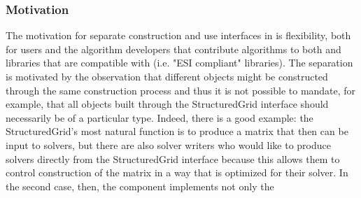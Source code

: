 \subsubsection{Motivation} The motivation for separate construction and use interfaces in
\hypre{} is flexibility, both for 
users and the algorithm developers that contribute algorithms to both \hypre{} and
libraries that are 
compatible with \hypre{} (i.e. "ESI compliant" libraries). The separation is
motivated by the observation 
that different objects might be constructed through the same construction
process and thus it is not possible 
to mandate, for example, that all objects built through the StructuredGrid
interface should necessarily be of 
a particular type. Indeed, there is a good example: the StructuredGrid's most
natural function is to produce 
a matrix that then can be input to solvers, but there are also solver writers
who would like to produce 
solvers directly from the StructuredGrid interface because this allows them to
control construction of the 
matrix in a way that is optimized for their solver. In the second case, then,
the component implements not only the 
